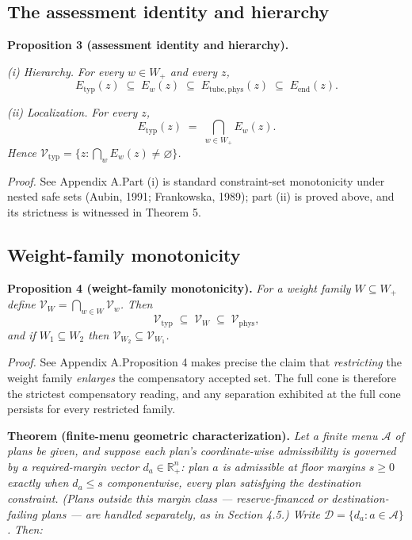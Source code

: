 \documentclass[review,11pt]{elsarticle}
\begin{document}
\subsection{The assessment identity and
hierarchy}\label{the-assessment-identity-and-hierarchy}

\textbf{Proposition 3 (assessment identity and hierarchy).}

\emph{(i) Hierarchy.} \emph{For every \(w \in W_+\) and every \(z\),}
\[E_{\mathrm{typ}}(z) \;\subseteq\; E_w(z) \;\subseteq\; E_{\mathrm{tube,phys}}(z) \;\subseteq\; E_{\mathrm{end}}(z).\]

\emph{(ii) Localization.} \emph{For every \(z\),}
\[E_{\mathrm{typ}}(z) \;=\; \bigcap_{w \in W_+} E_w(z).\] \emph{Hence
\(\mathcal{V}_{\mathrm{typ}} = \{ z : \bigcap_w E_w(z) \neq \varnothing \}\).}

\emph{Proof.} See Appendix A.Part (i) is standard constraint-set monotonicity under nested safe sets (Aubin, 1991; Frankowska, 1989); part (ii) is proved above, and its strictness is witnessed in Theorem 5.

\subsection{Weight-family
monotonicity}\label{weight-family-monotonicity}

\textbf{Proposition 4 (weight-family monotonicity).} \emph{For a weight
family \(W \subseteq W_+\) define
\(\mathcal{V}_W = \bigcap_{w \in W} \mathcal{V}_w\). Then}
\[\mathcal{V}_{\mathrm{typ}} \;\subseteq\; \mathcal{V}_W \;\subseteq\; \mathcal{V}_{\mathrm{phys}},\]
\emph{and if \(W_1 \subseteq W_2\) then
\(\mathcal{V}_{W_2} \subseteq \mathcal{V}_{W_1}\).}

\emph{Proof.} See Appendix A.Proposition 4 makes precise the claim that \emph{restricting} the weight
family \emph{enlarges} the compensatory accepted set. The full cone is
therefore the strictest compensatory reading, and any separation
exhibited at the full cone persists for every restricted family.

\textbf{Theorem (finite-menu geometric characterization).} \emph{Let a
finite menu \(\mathcal{A}\) of plans be given, and suppose each plan's
coordinate-wise admissibility is governed by a required-margin vector
\(d_a \in \mathbb{R}^n_+\): plan \(a\) is admissible at floor margins
\(s \ge 0\) exactly when \(d_a \le s\) componentwise, every plan
satisfying the destination constraint. (Plans outside this margin class
--- reserve-financed or destination-failing plans --- are handled
separately, as in Section 4.5.) Write \(\mathcal{D} = \{d_a : a \in \mathcal{A}\}\).}
\emph{Then:}
\end{document}
